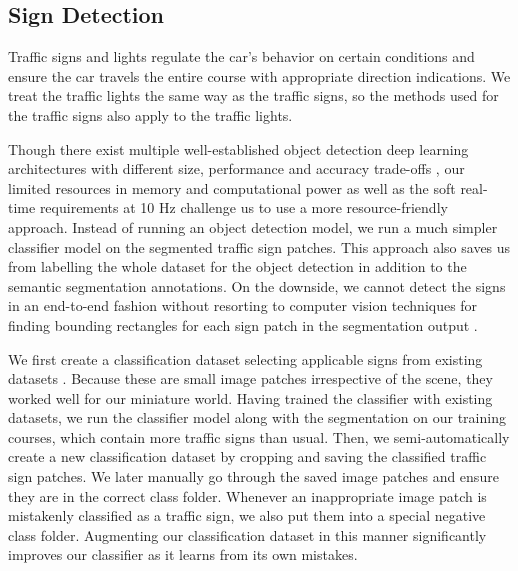 \subsection{Sign Detection}

Traffic signs and lights regulate the car's behavior on certain conditions and
ensure the car travels the entire course with appropriate direction indications.
We treat the traffic lights the same way as the traffic signs, so the methods
used for the traffic signs also apply to the traffic lights.

Though there exist multiple well-established object detection deep learning
architectures with different size, performance and accuracy trade-offs
\cite{Gupta2019PerformanceCO, Rezatofighi2019GeneralizedIO}, our limited
resources in memory and computational power as well as the soft real-time
requirements at 10 Hz challenge us to use a more resource-friendly approach.
Instead of running an object detection model, we run a much simpler classifier
model on the segmented traffic sign patches. This approach also saves us from
labelling the whole dataset for the object detection in addition to the
semantic segmentation annotations. On the downside, we cannot detect the signs
in an end-to-end fashion without resorting to computer vision techniques for
finding bounding rectangles for each sign patch in the segmentation output
\cite{Bradski2000CV}.

We first create a classification dataset selecting applicable signs from
existing datasets \cite{Timofte2009MultiviewTS, Stallkamp2012ManVC}. Because
these are small image patches irrespective of the scene, they worked well for
our miniature world. Having trained the classifier with existing datasets, we
run the classifier model along with the segmentation on our training courses,
which contain more traffic signs than usual. Then, we semi-automatically create
a new classification dataset by cropping and saving the classified traffic sign
patches. We later manually go through the saved image patches and ensure they
are in the correct class folder. Whenever an inappropriate image patch is
mistakenly classified as a traffic sign, we also put them into a special
negative class folder. Augmenting our classification dataset in this manner
significantly improves our classifier as it learns from its own mistakes.

